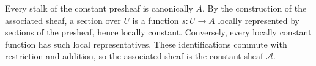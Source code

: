 Every stalk of the constant presheaf is canonically $A$. By the construction of the associated sheaf, a section over $U$ is a function $s:U\to A$ locally represented by sections of the presheaf, hence locally constant. Conversely, every locally constant function has such local representatives. These identifications commute with restriction and addition, so the associated sheaf is the constant sheaf $\mathscr A$.
